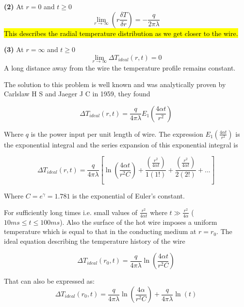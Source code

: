 \documentclass{article}
\begin{document}
\vspace{3mm}

\textbf{(2)} At $r = 0 $ and $t \geq 0$
$$ \displaystyle \lim_{r\to \infty} \left(r \frac{\delta T}{\delta r} \right) = -\frac{q}{2 \pi \lambda}$$
\hl{This describes the radial temperature distribution as we get closer to the wire.}

\newpage

\textbf{(3)} At $r = \infty$ and $t \geq 0$ 
$$\displaystyle \lim_{r\to \infty} \Delta T_{ideal}(r,t) = 0$$
A long distance away from the wire the temperature profile remains constant.

\vspace{3mm}

The solution to this problem is well known and was analytically proven by Carlslaw H S and Jaeger J C in 1959, they found

$$\Delta T_{ideal}(r,t) =  \frac{q}{4 \pi \lambda}  E_1 \left( \frac{4 \alpha t}{r^2}\right)$$

Where $q$ is the power input per unit length of wire. The expression $E_1 \left( \frac{4 \alpha t}{r^2}\right)$ is the exponential integral and the series expansion of this exponential integral is 

$$\Delta T_{ideal}(r,t) = \frac{q}{4 \pi \lambda} \left[ \ln \left( \frac{4 \alpha t}{r^2 C}\right) + \frac{\left( \frac{r^2}{4 \alpha t} \right)}{1(1!)} + \frac{\left( \frac{r^2}{4 \alpha t} \right)}{2(2!)} + ... \right]$$

Where $ C = e^{\gamma} = 1.781 $ is the exponential of Euler's constant. 

\vspace{3mm}

For sufficiently long times i.e. small values of $\frac{r^2}{4 \alpha t}$ where $t \gg \frac{r^2}{4 \alpha}$ ($10ms \le t \le 100ms$). Also the surface of the hot wire imposes a uniform temperature which is equal to that in the conducting medium at $r = r_0$. The ideal equation describing the temperature history of the wire 

$$\Delta T_{ideal}(r_0,t) =  \frac{q}{4 \pi \lambda} \ln \left( \frac{4 \alpha t}{r^2 C}\right)$$

That can also be expressed as:
$$\Delta T_{ideal}(r_0,t) =  \frac{q}{4 \pi \lambda} \ln \left( \frac{4 \alpha }{r^2 C}\right) + \frac{q}{4 \pi \lambda} \ln \left( t \right) $$
\end{document}
